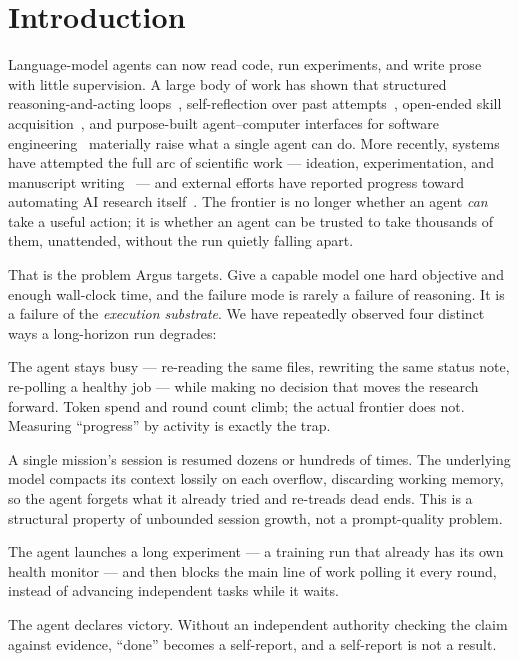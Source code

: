 \section{Introduction}
\label{sec:introduction}

Language-model agents can now read code, run experiments, and write prose with
little supervision. A large body of work has shown that structured
reasoning-and-acting loops~\cite{yao2023react}, self-reflection over past
attempts~\cite{shinn2023reflexion}, open-ended skill acquisition~\cite{wang2023voyager},
and purpose-built agent--computer interfaces for software
engineering~\cite{yang2024sweagent} materially raise what a single agent can do.
More recently, systems have attempted the full arc of scientific work ---
ideation, experimentation, and manuscript writing~\cite{lu2024aiscientist} --- and
external efforts have reported progress toward automating AI research
itself~\cite{recursive2026firststeps}. The frontier is no longer whether an agent
\emph{can} take a useful action; it is whether an agent can be trusted to take
thousands of them, unattended, without the run quietly falling apart.

That is the problem Argus targets. Give a capable model one hard objective and
enough wall-clock time, and the failure mode is rarely a failure of reasoning.
It is a failure of the \emph{execution substrate}. We have repeatedly observed
four distinct ways a long-horizon run degrades:

\begin{description}[leftmargin=1.4em, style=nextline]
  \item[High activity, low decision.] The agent stays busy --- re-reading the
    same files, rewriting the same status note, re-polling a healthy job ---
    while making no decision that moves the research forward. Token spend and
    round count climb; the actual frontier does not. Measuring ``progress'' by
    activity is exactly the trap.
  \item[Context amnesia.] A single mission's session is resumed dozens or
    hundreds of times. The underlying model compacts its context lossily on each
    overflow, discarding working memory, so the agent forgets what it already
    tried and re-treads dead ends. This is a structural property of unbounded
    session growth, not a prompt-quality problem.
  \item[Background-job babysitting.] The agent launches a long experiment --- a
    training run that already has its own health monitor --- and then blocks the
    main line of work polling it every round, instead of advancing independent
    tasks while it waits.
  \item[Premature acceptance.] The agent declares victory. Without an
    independent authority checking the claim against evidence, ``done'' becomes a
    self-report, and a self-report is not a result.
\end{description}


